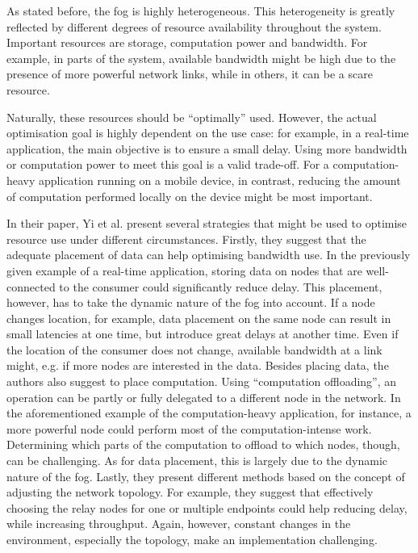 \documentclass{article}
\begin{document}
As stated before, the fog is highly heterogeneous. This heterogeneity is greatly reflected by different degrees of resource availability throughout the system. Important resources are storage, computation power and bandwidth. For example, in parts of the system, available bandwidth might be high due to the presence of more powerful network links, while in others, it can be a scare resource.

Naturally, these resources should be ``optimally'' used. However, the actual optimisation goal is highly dependent on the use case: for example, in a real-time application, the main objective is to ensure a small delay. Using more bandwidth or computation power to meet this goal is a valid trade-off. For a computation-heavy application running on a mobile device, in contrast, reducing the amount of computation performed locally on the device might be most important.

In their paper, Yi et al. \cite{yi2015survey} present several strategies that might be used to optimise resource use under different circumstances. 
%
Firstly, they suggest that the adequate placement of data can help optimising bandwidth use. In the previously given example of a real-time application, storing data on nodes that are well-connected to the consumer could significantly reduce delay. This placement, however, has to take the dynamic nature of the fog into account. If a node changes location, for example, data placement on the same node can result in small latencies at one time, but introduce great delays at another time. Even if the location of the consumer does not change, available bandwidth at a link might, e.g. if more nodes are interested in the data.
%
Besides placing data, the authors also suggest to place computation. Using ``computation offloading'', an operation can be partly or fully delegated to a different node in the network. In the aforementioned example of the computation-heavy application, for instance, a more powerful node could perform most of the computation-intense work. Determining which parts of the computation to offload to which nodes, though, can be challenging. As for data placement, this is largely due to the dynamic nature of the fog.
%
Lastly, they present different methods based on the concept of adjusting the network topology. For example, they suggest that effectively choosing the relay nodes for one or multiple endpoints could help reducing delay, while increasing throughput. Again, however, constant changes in the environment, especially the topology, make an implementation challenging.
\end{document}
